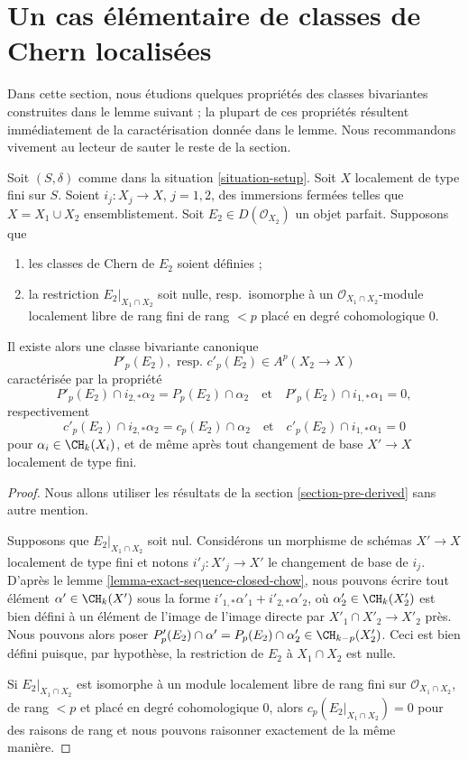 \section{Un cas élémentaire de classes de Chern localisées}
\label{section-preparation-localized-chern}

\noindent
Dans cette section, nous étudions quelques propriétés des classes bivariantes
construites dans le lemme suivant ; la plupart de ces propriétés résultent
immédiatement de la caractérisation donnée dans le lemme. Nous recommandons vivement au
lecteur de sauter le reste de la section.

\begin{lemma}
\label{lemma-silly}
Soit $(S, \delta)$ comme dans la situation \ref{situation-setup}. Soit $X$
localement de type fini sur $S$. Soient $i_j : X_j \to X$, $j = 1, 2$,
des immersions fermées telles que $X = X_1 \cup X_2$ ensemblistement. Soit
$E_2 \in D(\mathcal{O}_{X_2})$ un objet parfait. Supposons que
\begin{enumerate}
\item les classes de Chern de $E_2$ soient définies ;
\item la restriction $E_2|_{X_1 \cap X_2}$ soit nulle,
resp.\ isomorphe à un $\mathcal{O}_{X_1 \cap X_2}$-module localement libre de rang fini
de rang $< p$ placé en degré cohomologique $0$.
\end{enumerate}
Il existe alors une classe bivariante canonique
$$
P'_p(E_2),\text{ resp. }c'_p(E_2) \in A^p(X_2 \to X)
$$
caractérisée par la propriété
$$
P'_p(E_2) \cap i_{2, *} \alpha_2 = P_p(E_2) \cap \alpha_2
\quad\text{et}\quad
P'_p(E_2) \cap i_{1, *} \alpha_1 = 0,
$$
respectivement
$$
c'_p(E_2) \cap i_{2, *} \alpha_2 = c_p(E_2) \cap \alpha_2
\quad\text{et}\quad
c'_p(E_2) \cap i_{1, *} \alpha_1 = 0
$$
pour $\alpha_i \in \CH_k(X_i)$, et de même après tout changement de base
$X' \to X$ localement de type fini.
\end{lemma}

\begin{proof}
Nous allons utiliser les résultats de la section \ref{section-pre-derived}
sans autre mention.

\medskip\noindent
Supposons que $E_2|_{X_1 \cap X_2}$ soit nul.
Considérons un morphisme de schémas $X' \to X$
localement de type fini et notons $i'_j : X'_j \to X'$ le
changement de base de $i_j$. D'après le lemme \ref{lemma-exact-sequence-closed-chow},
nous pouvons écrire tout élément $\alpha' \in \CH_k(X')$ sous la forme
$i'_{1, *}\alpha'_1 + i'_{2, *}\alpha'_2$, où
$\alpha'_2 \in \CH_k(X'_2)$
est bien défini à un élément de l'image de l'image directe
par $X'_1 \cap X'_2 \to X'_2$ près. Nous pouvons alors poser
$P'_p(E_2) \cap \alpha' = P_p(E_2) \cap \alpha'_2 \in \CH_{k - p}(X'_2)$. Ceci
est bien défini puisque, par hypothèse, la restriction de $E_2$
à $X_1 \cap X_2$ est nulle.

\medskip\noindent
Si $E_2|_{X_1 \cap X_2}$ est isomorphe à un module localement libre de rang fini
sur $\mathcal{O}_{X_1 \cap X_2}$, de rang $< p$ et placé en
degré cohomologique $0$, alors $c_p(E_2|_{X_1 \cap X_2}) = 0$
pour des raisons de rang et nous pouvons raisonner exactement de la même manière.
\end{proof}

